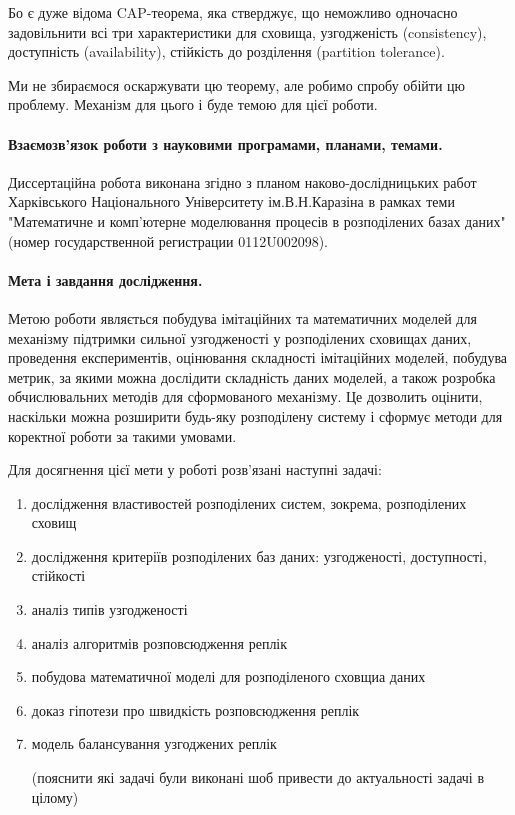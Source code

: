\documentclass[14pt]{vakthesis}
\begin{document}
Бо є дуже відома CAP-теорема, яка стверджує, що неможливо одночасно задовільнити всі три 
характеристики для сховища, узгодженість (consistency), доступність (availability), 
стійкість до розділення (partition tolerance).

Ми не збираємося оскаржувати цю теорему, але робимо спробу обійти цю проблему. Механізм для цього і буде темою для цієї роботи.

\paragraph{\bfseries Взаємозв'язок роботи з науковими програмами, планами, темами.}
Диссертаційна робота виконана згідно з планом \linebreak
наково-дослідницьких работ Харківського Національного Університету ім.В.Н.Каразіна в рамках теми "Математичне и комп'ютерне моделювання процесів в розподілених базах даних" 
(номер государственной регистрации 0112U002098).


\paragraph{\bfseries Мета і завдання дослідження.}
Метою роботи являється побудува імітаційних та математичних моделей для механізму
підтримки сильної узгодженості у розподілених сховищах даних, проведення експериментів, оцінювання складності імітаційних моделей, побудува метрик, за якими можна дослідити складність даних моделей, а також розробка
обчислювальних методів для сформованого механізму. Це дозволить оцінити, наскільки можна розширити будь-яку розподілену систему і сформує методи для коректної роботи за такими умовами.

Для досягнення цієї мети у роботі розв'язані наступні задачі:
\begin{enumerate}[widest=9999,itemindent=*,leftmargin=0pt]
\item дослідження властивостей розподілених систем, зокрема, розподілених сховищ
\item дослідження критеріїв розподілених баз даних: узгодженості, доступності, стійкості
\item аналіз типів узгодженості
\item аналіз алгоритмів розповсюдження реплік
\item побудова математичної моделі для розподіленого сховщиа даних
\item доказ гіпотези про швидкість розповсюдження реплік
\item модель балансування узгоджених реплік
 
(пояснити які задачі були виконані шоб привести до актуальності задачі в цілому)

\end{enumerate}
\end{document}
